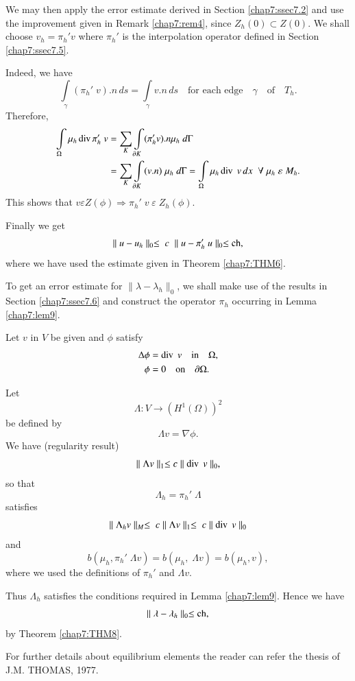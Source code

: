 We may then apply the error estimate derived in Section
\ref{chap7:ssec7.2} and use the improvement given in Remark
\ref{chap7:rem4}, since $Z_h(0)\subset Z(0)$. We shall choose
$v_h=\pi_h'v$ where $\pi_h'$ is the interpolation operator defined in
Section \ref{chap7:ssec7.5}.

Indeed, we have 
$$
\int\limits_\gamma(\pi_h'\;v).n\,ds=\int\limits_\gamma v.n\,ds\quad
\text{for each edge}\quad\gamma\quad\text{of}\quad T_h.
$$
Therefore,\pageoriginale
\begin{align*}
\int\limits_\Omega\mu_h \operatorname{div}\pi_h'\;v &= \sum\limits_K
\int\limits_{\partial K}(\pi_h'v).n\mu_h\;d\Gamma\\
&= \sum\limits_K\int\limits_{\partial K}(v.n)\;\mu_h\;d\Gamma =
\int\limits_\Omega\mu_h\operatorname{div} \;v\,dx\; \; \forall \;\mu_h\;\varepsilon
\;M_h. 
\end{align*}
This shows that $v\varepsilon Z(\phi)\Rightarrow\pi_h'\;v\;\varepsilon
\;Z_h(\phi)$. 

Finally we get
$$
\parallel u-u_h\parallel_0\leq \;c\;\parallel u-\pi_h'\;u \parallel_0
\leq \operatorname{ch},
$$
where we have used the estimate given in Theorem \ref{chap7:THM6}.

To get an error estimate for $\parallel\lambda-\lambda_h\parallel_0$,
we shall make use of the results in Section \ref{chap7:ssec7.6} and construct 
the operator $\pi_h$ occurring in Lemma \ref{chap7:lem9}.

Let $v$ in $V$ be given and $\phi$ satisfy
\begin{align*}
\Delta\phi &= \operatorname{div} \;v\quad\text{in}\quad\Omega,\\
\phi &= 0\quad\text{on}\quad\partial\Omega.
\end{align*}

Let 
$$
\Lambda :V\to(H^1(\Omega))^2
$$
be defined by 
$$
\Lambda v=\nabla\phi.
$$
We have (regularity result)
$$
\parallel \Lambda v\parallel_1\leq c\parallel\operatorname{div}\;v \parallel_0,
$$
so that 
$$
\Lambda_h=\pi_h'\;\Lambda
$$\pageoriginale
satisfies
$$
\parallel\Lambda_hv\parallel_M\leq\;c\parallel\Lambda v\parallel_1\leq
\;c\parallel\operatorname{div} \;v\parallel_0
$$
and 
$$
b(\mu_h,\pi_h'\;\Lambda v)=b(\mu_h,\;\Lambda v)=b(\mu_h,v),
$$
where we used the definitions of $\pi_h'$ and $\Lambda v$.

Thus $\Lambda_h$ satisfies the conditions required in Lemma
\ref{chap7:lem9}. Hence we have 
$$
\parallel\lambda-\lambda_h\parallel_0\leq\operatorname{ch},
$$
by Theorem \ref{chap7:THM8}. 

For further details about equilibrium elements the reader can refer
the thesis of J.M. THOMAS, 1977.

